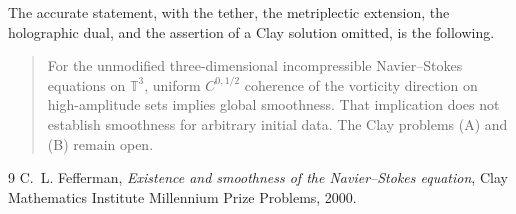 \documentclass[11pt,a4paper]{article}
\theoremstyle{definition}
\theoremstyle{remark}
\newcommand{\T}{\mathbb{T}}
\begin{document}
The accurate statement, with the tether, the metriplectic extension, the holographic dual, and the assertion of a Clay solution omitted, is the following.

\begin{quote}
For the unmodified three-dimensional incompressible Navier--Stokes equations on $\T^3$, uniform $C^{0,1/2}$ coherence of the vorticity direction on high-amplitude sets implies global smoothness. That implication does not establish smoothness for arbitrary initial data. The Clay problems (A) and (B) remain open.
\end{quote}

\begin{thebibliography}{9}
C.~L. Fefferman,
\emph{Existence and smoothness of the Navier--Stokes equation},
Clay Mathematics Institute Millennium Prize Problems, 2000.
\end{thebibliography}
\end{document}
